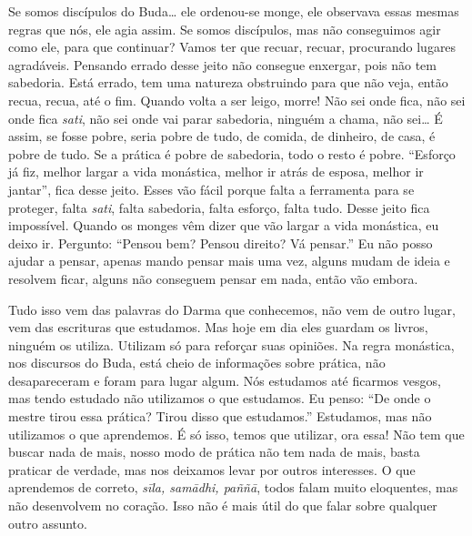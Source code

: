 Se somos discípulos do Buda… ele ordenou-se monge, ele observava
essas mesmas regras que nós, ele agia assim. Se somos discípulos, mas
não conseguimos agir como ele, para que continuar? Vamos ter que
recuar, recuar, procurando lugares agradáveis. Pensando errado desse
jeito não consegue enxergar, pois não tem sabedoria. Está errado, tem
uma natureza obstruindo para que não veja, então recua, recua, até o
fim. Quando volta a ser leigo, morre! Não sei onde fica, não sei onde
fica \textit{sati}, não sei onde vai parar sabedoria, ninguém a chama,
não sei… É assim, se fosse pobre, seria pobre de tudo, de comida, de
dinheiro, de casa, é pobre de tudo. Se a prática é pobre de sabedoria,
todo o resto é pobre. “Esforço já fiz, melhor largar a vida monástica,
melhor ir atrás de esposa, melhor ir jantar”, fica desse jeito. Esses
vão fácil porque falta a ferramenta para se proteger, falta
\textit{sati}, falta sabedoria, falta esforço, falta tudo. Desse jeito
fica impossível. Quando os monges vêm dizer que vão largar a vida
monástica, eu deixo ir. Pergunto: “Pensou bem? Pensou direito? Vá
pensar.” Eu não posso ajudar a pensar, apenas mando pensar mais uma
vez, alguns mudam de ideia e resolvem ficar, alguns não conseguem
pensar em nada, então vão embora. 

Tudo isso vem das palavras do Darma que conhecemos, não vem de outro
lugar, vem das escrituras que estudamos. Mas hoje em dia eles guardam
os livros, ninguém os utiliza. Utilizam só para reforçar suas opiniões.
Na regra monástica, nos discursos do Buda, está cheio de informações
sobre prática, não desapareceram e foram para lugar algum. Nós
estudamos até ficarmos vesgos, mas tendo estudado não utilizamos o que
estudamos. Eu penso: “De onde o mestre tirou essa prática? Tirou disso
que estudamos.” Estudamos, mas não utilizamos o que aprendemos. É só
isso, temos que utilizar, ora essa! Não tem que buscar nada de mais,
nosso modo de prática não tem nada de mais, basta praticar de verdade,
mas nos deixamos levar por outros interesses. O que aprendemos de
correto, \textit{sīla, samādhi, paññā}, todos falam muito
eloquentes, mas não desenvolvem no coração. Isso não é mais útil do que
falar sobre qualquer outro assunto. 

